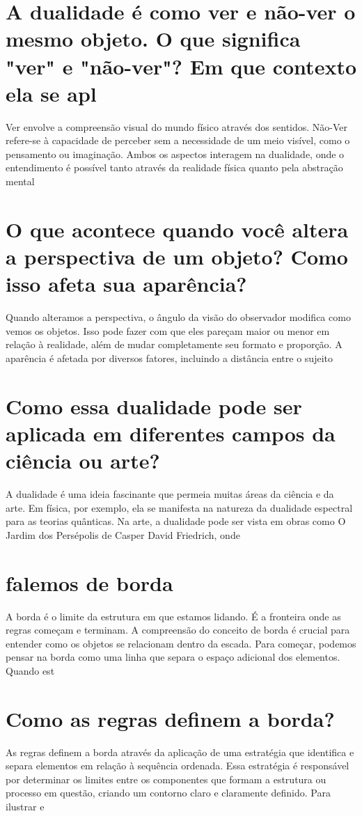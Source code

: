 \documentclass[11pt,a4paper]{article}
\begin{document}
\section{A dualidade é como ver e não-ver o mesmo objeto. O que significa "ver" e "não-ver"? Em que contexto ela se apl}
Ver envolve a compreensão visual do mundo físico através dos sentidos. Não-Ver refere-se à capacidade de perceber sem a necessidade de um meio visível, como o pensamento ou imaginação. Ambos os aspectos interagem na dualidade, onde o entendimento é possível tanto através da realidade física quanto pela abstração mental

\section{O que acontece quando você altera a perspectiva de um objeto? Como isso afeta sua aparência?}
Quando alteramos a perspectiva, o ângulo da visão do observador modifica como vemos os objetos. Isso pode fazer com que eles pareçam maior ou menor em relação à realidade, além de mudar completamente seu formato e proporção. A aparência é afetada por diversos fatores, incluindo a distância entre o sujeito

\section{Como essa dualidade pode ser aplicada em diferentes campos da ciência ou arte?}
A dualidade é uma ideia fascinante que permeia muitas áreas da ciência e da arte. Em física, por exemplo, ela se manifesta na natureza da dualidade espectral para as teorias quânticas. Na arte, a dualidade pode ser vista em obras como O Jardim dos Persépolis de Casper David Friedrich, onde

\section{falemos de borda}
A borda é o limite da estrutura em que estamos lidando. É a fronteira onde as regras começam e terminam. A compreensão do conceito de borda é crucial para entender como os objetos se relacionam dentro da escada. Para começar, podemos pensar na borda como uma linha que separa o espaço adicional dos elementos. Quando est

\section{Como as regras definem a borda?}
As regras definem a borda através da aplicação de uma estratégia que identifica e separa elementos em relação à sequência ordenada. Essa estratégia é responsável por determinar os limites entre os componentes que formam a estrutura ou processo em questão, criando um contorno claro e claramente definido. Para ilustrar e
\end{document}

